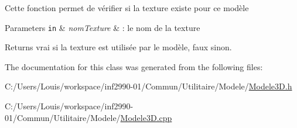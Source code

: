 Cette fonction permet de vérifier si la texture existe pour ce modèle


\begin{DoxyParams}[1]{Parameters}
\mbox{\tt in}  & {\em nom\+Texture} & \+: le nom de la texture\\
\hline
\end{DoxyParams}
\begin{DoxyReturn}{Returns}
vrai si la texture est utilisée par le modèle, faux sinon. 
\end{DoxyReturn}


The documentation for this class was generated from the following files\+:\begin{DoxyCompactItemize}
\item 
C\+:/\+Users/\+Louis/workspace/inf2990-\/01/\+Commun/\+Utilitaire/\+Modele/\hyperlink{_modele3_d_8h}{Modele3\+D.\+h}\item 
C\+:/\+Users/\+Louis/workspace/inf2990-\/01/\+Commun/\+Utilitaire/\+Modele/\hyperlink{_modele3_d_8cpp}{Modele3\+D.\+cpp}\end{DoxyCompactItemize}
